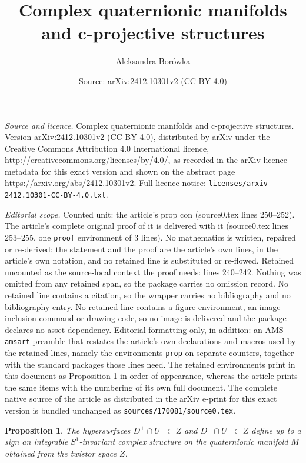 \documentclass[10pt,a4paper]{amsart}
\title{Complex quaternionic manifolds and c-projective structures}
\author{Aleksandra Bor\'owka}
\date{Source: arXiv:2412.10301v2 (CC BY 4.0)}
\newtheorem{prop}{Proposition}
\begin{document}
\maketitle

\noindent\emph{Source and licence.} Complex quaternionic manifolds and c-projective structures. Version arXiv:2412.10301v2 (CC BY 4.0), distributed by arXiv under the Creative Commons Attribution 4.0 International licence, http://creativecommons.org/licenses/by/4.0/, as recorded in the arXiv licence metadata for this exact version and shown on the abstract page https://arxiv.org/abs/2412.10301v2. Full licence notice: \texttt{licenses/arxiv-2412.10301-CC-BY-4.0.txt}.\par\smallskip

\noindent\textit{Editorial scope.} Counted unit: the article's prop con (source0.tex lines 250--252). The article's complete original proof of it is delivered with it (source0.tex lines 253--255, one \texttt{proof} environment of 3 lines). No mathematics is written, repaired or re-derived: the statement and the proof are the article's own lines, in the article's own notation, and no retained line is substituted or re-flowed.  Retained uncounted as the source-local context the proof needs: lines 240--242.  Nothing was omitted from any retained span, so the package carries no omission record.  No retained line contains a citation, so the wrapper carries no bibliography and no bibliography entry.  No retained line contains a figure environment, an image-inclusion command or drawing code, so no image is delivered and the package declares no asset dependency.  Editorial formatting only, in addition: an AMS \texttt{amsart} preamble that restates the article's own declarations and macros used by the retained lines, namely the environments \texttt{prop} on separate counters, together with the standard packages those lines need.  The retained environments print in this document as Proposition 1 in order of appearance, whereas the article prints the same items with the numbering of its own full document.  The complete native source of the article as distributed in the arXiv e-print for this exact version is bundled unchanged as \texttt{sources/170081/source0.tex}.
\begin{prop}\label{main}
 The hypersurfaces $D^+\cap U^+\subset Z$ and $D^-\cap U^-\subset Z$ define up to a sign an integrable $S^1$-invariant complex structure on the quaternionic manifold $M$ obtained from the twistor space $Z$.
\end{prop}
\end{document}
